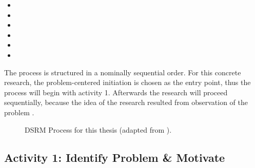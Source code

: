 \begin{itemize}
	\item {}
	\item {}
	\item {}
	\item {}
	\item {}
	\item {}
\end{itemize}

The process is structured in a nominally sequential order.
For this concrete research,
the problem-centered initiation is chosen as the entry point,
thus the process will begin with activity 1.
Afterwards the research will proceed sequentially,
because the idea of the research resulted from observation of the problem
\autocite{designScienceResearchMethodologyForInformationSystemsResearch}.
\bigskip


\begin{landscape}
\begin{figure}[h]
	\centering
	\caption{DSRM Process for this thesis (adapted from \cite{designScienceResearchMethodologyForInformationSystemsResearch}).
	}
	\label{fig:dsrmProcessReleasePromotionGitOps}	
\end{figure}
\end{landscape}

\subsection{Activity 1: Identify Problem \& Motivate}
\label{methodology:activity1}


